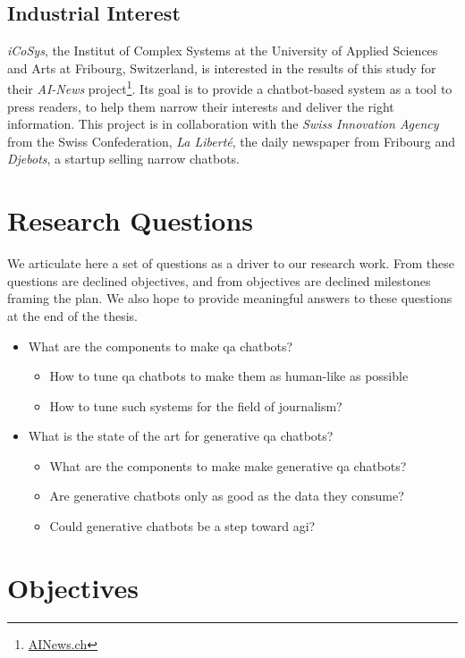 \subsection{Industrial Interest}
\textit{iCoSys}, the Institut of Complex Systems at the University of Applied Sciences and Arts at Fribourg, Switzerland, is interested in the results of this study for their \textit{AI-News} project\footnote{\url{AINews.ch}}. Its goal is to provide a chatbot-based system as a tool to press readers, to help them narrow their interests and deliver the right information. This project is in collaboration with the \textit{Swiss Innovation Agency} from the Swiss Confederation, \textit{La Liberté}, the daily newspaper from Fribourg and \textit{Djebots}, a startup selling narrow chatbots.

\section{Research Questions}
We articulate here a set of questions as a driver to our research work. From these questions are declined objectives, and from objectives are declined milestones framing the plan. We also hope to provide meaningful answers to these questions at the end of the thesis.
\begin{itemize}[noitemsep]
    \item What are the components to make \gls{qa} chatbots?
    \begin{itemize}[noitemsep]
        \item How to tune \gls{qa} chatbots to make them as human-like as possible
        \item How to tune such systems for the field of journalism?
    \end{itemize}
    \item What is the state of the art for generative \gls{qa} chatbots?
    \begin{itemize}[noitemsep]
    	\item What are the components to make make generative \gls{qa} chatbots?
        \item Are generative chatbots only as good as the data they consume?
        \item Could generative chatbots be a step toward \gls{agi}?
    \end{itemize}
\end{itemize}

\section{Objectives}
